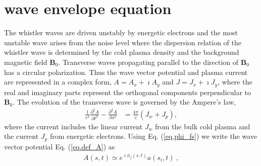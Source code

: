 \section{wave envelope equation}
The whistler waves 
are driven unstably by energetic electrons
 and 
the most unstable wave 
 arises from the noise level
 where the dispersion relation of the whistler wave
is determined by 
the  cold plasma density and the background magnetic field $\mathbf{B}_0$.
Transverse waves propagating parallel to the direction of 
$\mathbf{B}_0$
has a circular polarization. 
Thus the wave vector potential and plasma current are represented in a complex form,
$A = A_x + \imath A_y$ and $J = J_x + \imath J_y$,
where the real and imaginary parts represent the orthogonal components
perpendicular to $\mathbf{B}_0$.
The evolution of the transverse wave is governed by the Ampere's law, 
\begin{equation}
    \begin{aligned}
        \label{eq.wavemid_1}
        \frac{1}{c^{2}} \frac{\partial^{2} A}{\partial t^{2}}-\frac{\partial^{2} A}{\partial s^{2}} & =\frac{4 \pi}{c}\left(J_w+J_p\right),
    \end{aligned}
\end{equation}
where the current includes the linear current $J_w$ from the bulk cold plasma and the current $J_p$ from energetic electrons.
Using Eq. (\ref{eq.phi_fs}) we  write the wave vector potential  Eq. (\ref{eq.def_A}) as 
\begin{equation}\label{eq.kernel_A}
    \begin{aligned}
    A(s,t)%
    \simeq e^{\imath \phi_f(s,t)}  a(s_i, t)~,
    \end{aligned}
\end{equation}
